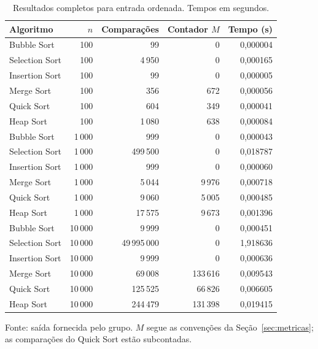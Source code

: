 \begin{table}[htbp]
\centering
\small
\caption{Resultados completos para entrada ordenada. Tempos em segundos.}
\label{tab:sorted}
\begin{tabular}{lrrrr}
\toprule
Algoritmo & $n$ & Comparações & Contador $M$ & Tempo (s) \\
\midrule
Bubble Sort & 100 & 99 & 0 & 0,000004 \\
Selection Sort & 100 & 4\,950 & 0 & 0,000165 \\
Insertion Sort & 100 & 99 & 0 & 0,000005 \\
Merge Sort & 100 & 356 & 672 & 0,000056 \\
Quick Sort & 100 & 604 & 349 & 0,000041 \\
Heap Sort & 100 & 1\,080 & 638 & 0,000084 \\
\midrule
Bubble Sort & 1\,000 & 999 & 0 & 0,000043 \\
Selection Sort & 1\,000 & 499\,500 & 0 & 0,018787 \\
Insertion Sort & 1\,000 & 999 & 0 & 0,000060 \\
Merge Sort & 1\,000 & 5\,044 & 9\,976 & 0,000718 \\
Quick Sort & 1\,000 & 9\,060 & 5\,005 & 0,000485 \\
Heap Sort & 1\,000 & 17\,575 & 9\,673 & 0,001396 \\
\midrule
Bubble Sort & 10\,000 & 9\,999 & 0 & 0,000451 \\
Selection Sort & 10\,000 & 49\,995\,000 & 0 & 1,918636 \\
Insertion Sort & 10\,000 & 9\,999 & 0 & 0,000636 \\
Merge Sort & 10\,000 & 69\,008 & 133\,616 & 0,009543 \\
Quick Sort & 10\,000 & 125\,525 & 66\,826 & 0,006605 \\
Heap Sort & 10\,000 & 244\,479 & 131\,398 & 0,019415 \\
\bottomrule
\end{tabular}
\par\smallskip\footnotesize Fonte: saída fornecida pelo grupo. $M$ segue as convenções da Seção~\ref{sec:metricas}; as comparações do Quick Sort estão subcontadas.
\end{table}
